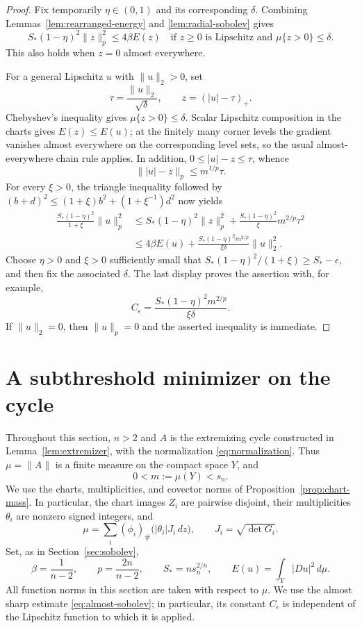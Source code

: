 \documentclass[11pt]{article}
\numberwithin{equation}{section}
\theoremstyle{definition}
\theoremstyle{remark}
\begin{document}
\begin{proof}
Fix temporarily $\eta\in(0,1)$ and its corresponding $\delta$.
Combining Lemmas~\ref{lem:rearranged-energy} and
\ref{lem:radial-sobolev} gives
\begin{equation}
 S_*(1-\eta)^2\|z\|_p^2\le4\beta E(z)
 \quad\text{if }z\ge0\text{ is Lipschitz and }\mu\{z>0\}\le\delta.
 \label{eq:small-support-sobolev}
\end{equation}
This also holds when $z=0$ almost everywhere.

For a general Lipschitz $u$ with $\|u\|_2>0$, set
\[
 \tau=\frac{\|u\|_2}{\sqrt\delta},\qquad z=(|u|-\tau)_+.
\]
Chebyshev's inequality gives $\mu\{z>0\}\le\delta$.
Scalar Lipschitz composition in the charts gives $E(z)\le E(u)$;
at the finitely many corner levels the gradient vanishes almost
everywhere on the corresponding level sets, so the usual
almost-everywhere chain rule applies.  In addition,
$0\le|u|-z\le\tau$, whence
\[
 \||u|-z\|_p\le m^{1/p}\tau.
\]
For every $\xi>0$, the triangle inequality followed by
$(b+d)^2\le(1+\xi)b^2+(1+\xi^{-1})d^2$ now yields
\begin{align*}
 \frac{S_*(1-\eta)^2}{1+\xi}\|u\|_p^2
 &\le S_*(1-\eta)^2\|z\|_p^2
       +\frac{S_*(1-\eta)^2}{\xi}m^{2/p}\tau^2\\
 &\le4\beta E(u)
       +\frac{S_*(1-\eta)^2m^{2/p}}{\xi\delta}\|u\|_2^2.
\end{align*}
Choose $\eta>0$ and $\xi>0$ sufficiently small that
$S_*(1-\eta)^2/(1+\xi)\ge S_*-\epsilon$, and then fix the associated
$\delta$.  The last display proves the assertion with, for example,
\[
 C_\epsilon=\frac{S_*(1-\eta)^2m^{2/p}}{\xi\delta}.
\]
If $\|u\|_2=0$, then $\|u\|_p=0$ and the asserted inequality is
immediate.
\end{proof}

\section{A subthreshold minimizer on the cycle}
\label{sec:minimizer}

Throughout this section, $n>2$ and $A$ is the extremizing cycle constructed
in Lemma~\ref{lem:extremizer}, with the normalization
\eqref{eq:normalization}.  Thus $\mu=\|A\|$ is a finite measure on the
compact space $Y$, and
\[
 0<m:=\mu(Y)<s_n.
\]
We use the charts, multiplicities, and covector norms of
Proposition~\ref{prop:chart-mass}.  In particular, the chart images $Z_i$
are pairwise disjoint, their multiplicities
$\theta_i$ are nonzero signed integers, and
\[
 \mu=\sum_i(\phi_i)_\#\bigl(|\theta_i|J_i\,dz\bigr),
 \qquad J_i=\sqrt{\det G_i}.
\]
Set, as in Section~\ref{sec:sobolev},
\[
 \beta=\frac1{n-2},\qquad p=\frac{2n}{n-2},\qquad
 S_*=ns_n^{2/n},\qquad E(u)=\int_Y|Du|^2\,d\mu.
\]
All function norms in this section are taken with respect to $\mu$.
We use the almost sharp estimate \eqref{eq:almost-sobolev}; in particular,
its constant $C_\epsilon$ is independent of the Lipschitz function to
which it is applied.
\end{document}
